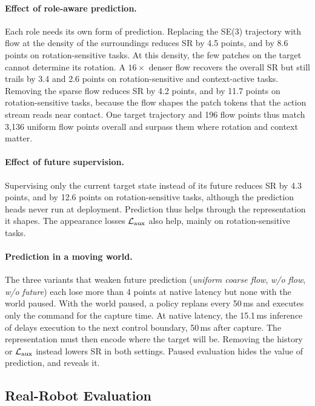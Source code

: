 \paragraph{Effect of role-aware prediction.}
Each role needs its own form of prediction. Replacing the SE(3) trajectory with flow at
the density of the surroundings reduces SR by 4.5 points, and by 8.6 points on
rotation-sensitive tasks. At this density, the few patches on the target cannot
determine its rotation. A $16\times$ denser flow recovers the overall SR but still
trails \ours by 3.4 and 2.6 points on rotation-sensitive and context-active tasks.
Removing the sparse flow reduces SR by 4.2 points, and by 11.7 points on
rotation-sensitive tasks, because the flow shapes the patch tokens that the action
stream reads near contact. One target trajectory and 196 flow points thus match
3{,}136 uniform flow points overall and surpass them where rotation and context matter.

\paragraph{Effect of future supervision.}
Supervising only the current target state instead of its future reduces SR by 4.3
points, and by 12.6 points on rotation-sensitive tasks, although the prediction heads
never run at deployment. Prediction thus helps through the representation it
shapes. The appearance losses $\mathcal L_{\rm aux}$ also help,
mainly on rotation-sensitive tasks.

\paragraph{Prediction in a moving world.}
The three variants that weaken future prediction (\emph{uniform coarse flow},
\emph{w/o flow}, \emph{w/o future}) each lose more than 4 points at native latency
but none with the world paused. With the world paused, a policy replans every 50\,ms
and executes only the command for the capture time. At native latency, the
15.1\,ms inference of \ours delays execution to the next control boundary, 50\,ms after
capture. The representation must then encode where the target will be. Removing the history or
$\mathcal L_{\rm aux}$ instead lowers SR in both settings. Paused evaluation hides the
value of prediction, and \bench reveals it.

\subsection{Real-Robot Evaluation}
\label{sec:real}

